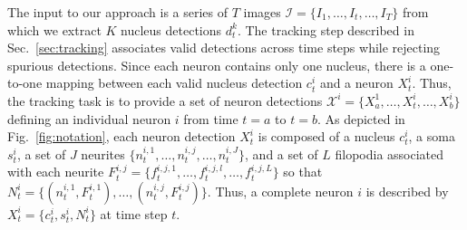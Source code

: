 
\vspace{-3mm}

The input  to our approach  is a series  of $T$ images  $\mathcal{I} =
\{I_1, \ldots, I_t,  \ldots, I_T\}$ from which we  extract $K$ nucleus
detections    $d_t^k$.     The     tracking    step    described    in
Sec.~\ref{sec:tracking} associates valid  detections across time steps
while rejecting  spurious detections. Since each  neuron contains only
one nucleus, there is a  one-to-one mapping between each valid nucleus
detection  $c_t^i$ and  a neuron  $X_t^i$. Thus,  the tracking task  is to
provide    a    set   of    neuron    detections   $\mathcal{X}^i    =
\{X_{a}^1,\ldots,X_t^i,\ldots,X_{b}^i   \}$  defining   an  individual
neuron   $i$   from   time   $t=a$   to   $t=b$.    As   depicted   in
Fig.~\ref{fig:notation}, each neuron  detection $X_t^i$ is composed of
a nucleus $c_t^i$, a soma $s_t^i$, a set of $J$ neurites $\{n_t^{i,1},
\ldots, n_t^{i,j}, \ldots,  n_t^{i,J} \}$, and a set  of $L$ filopodia
associated       with       each       neurite      $F_t^{i,j}       =
\{f_t^{i,j,1},\ldots,f_t^{i,j,l},\ldots,f_t^{i,j,L} \}$ so that $N_t^i
=  \{( n_t^{i,1},F_t^{i,1}), \ldots,(n_t^{i,j},F_t^{i,j})  \}$.  Thus,
a complete neuron $i$ is described by
$X_t^i = \{ c_t^i, s_t^i, N_t^i \}$ at time step $t$.


